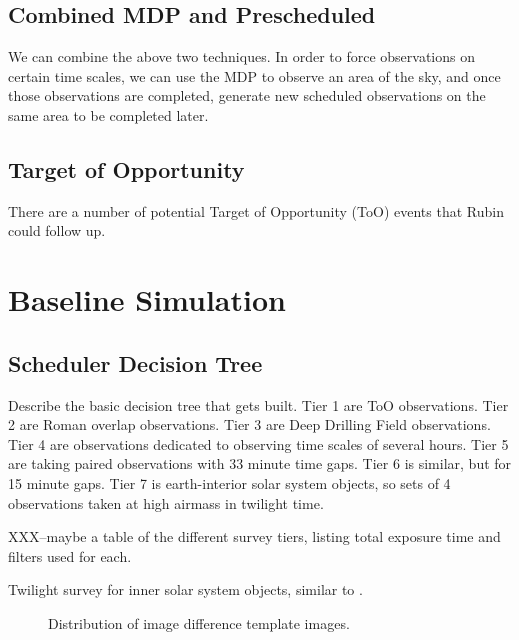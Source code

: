 \documentclass[]{aastex631}
\begin{document}
\subsection{Combined MDP and Prescheduled}

We can combine the above two techniques. In order to force observations on certain time scales, we can use the MDP to observe an area of the sky, and once those observations are completed, generate new scheduled observations on the same area to be completed later. 

\subsection{Target of Opportunity}

There are a number of potential Target of Opportunity (ToO) events that Rubin could follow up. 


\section{Baseline Simulation}


\subsection{Scheduler Decision Tree}

Describe the basic decision tree that gets built. Tier 1 are ToO observations. Tier 2 are Roman overlap observations. Tier 3 are Deep Drilling Field observations. Tier 4 are observations dedicated to observing time scales of several hours. Tier 5 are taking paired observations with 33 minute time gaps. Tier 6 is similar, but for 15 minute gaps. Tier 7 is earth-interior solar system objects, so sets of 4 observations taken at high airmass in twilight time.

XXX--maybe a table of the different survey tiers, listing total exposure time and filters used for each.





Twilight survey for inner solar system objects, similar to \citet{Ye2020}.



\begin{figure}
\caption{Distribution of image difference template images. \label{fig:tiers_templates}}
\end{figure}
\end{document}
